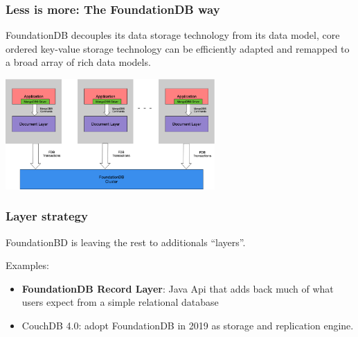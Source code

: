 \begin{frame}
	\frametitle{Less is more: The FoundationDB way}
FoundationDB decouples its data storage technology from its data model, core ordered key-value storage 
technology can be efficiently adapted and remapped to a broad array of rich data models.
\vspace{0.5cm}

\begin{center}
    \includegraphics[width=0.6\textwidth]{img/1-Introduction/sidecar-arch.png}
\end{center}

\end{frame}



\begin{frame}
	\frametitle{Layer strategy}

FoundationBD is leaving the rest to additionals “layers”.

\vspace{0.5cm}
Examples:
\begin{itemize}
    \item \textbf{FoundationDB Record Layer}: Java Api that adds back much of what users expect from a simple relational database 
    \item CouchDB 4.0: adopt FoundationDB in 2019 as storage and replication engine.
\end{itemize}
\end{frame}



